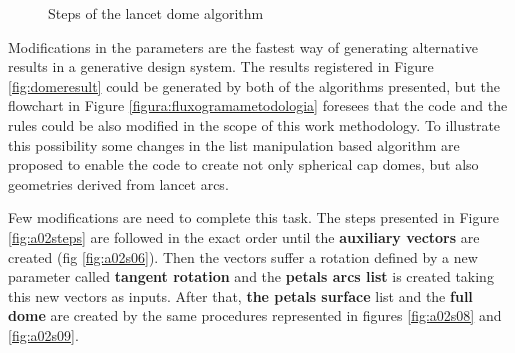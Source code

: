 \documentclass[preprint,12pt,3p]{elsarticle}
\begin{document}
\begin{figure}[h]
\caption{Steps of the lancet dome algorithm}
\label{fig:lancetdome}
\end{figure}

Modifications in the parameters are the fastest way of generating alternative results in a generative design system. The results registered in Figure \ref{fig:domeresult} could be generated by both of the algorithms presented, but the flowchart in Figure \ref{figura:fluxogramametodologia} foresees that the code and the rules could be also modified in the scope of this work methodology. To illustrate this possibility some changes in the list manipulation based algorithm are proposed to enable the code to create not only spherical cap domes, but also geometries derived from lancet arcs.




Few modifications are need to complete this task. The steps presented in Figure \ref{fig:a02steps} are followed in the exact order until the \textbf{auxiliary vectors} are created (fig \ref{fig:a02s06}). Then the vectors suffer a rotation defined by a new parameter called \textbf{tangent rotation} and the \textbf{petals arcs list} is created taking this new vectors as inputs. After that,\textbf{ the petals surface} list and the \textbf{full dome} are created by the same procedures represented in figures \ref{fig:a02s08} and \ref{fig:a02s09}.
\end{document}
